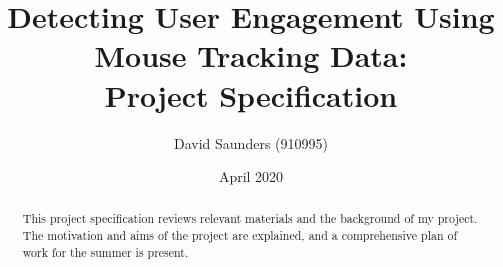 \documentclass{article}
\title{Detecting User Engagement Using \\ Mouse Tracking Data:\\
    \large Project Specification
}
\author{David Saunders (910995)}
\date{April 2020}
\begin{document}
\maketitle

\begin{abstract} 
    This project specification reviews relevant materials and the background of my project.
    The motivation and aims of the project are explained, and a comprehensive plan of work for the summer is present.
    
\end{abstract}

\tableofcontents






% 



\end{document}
